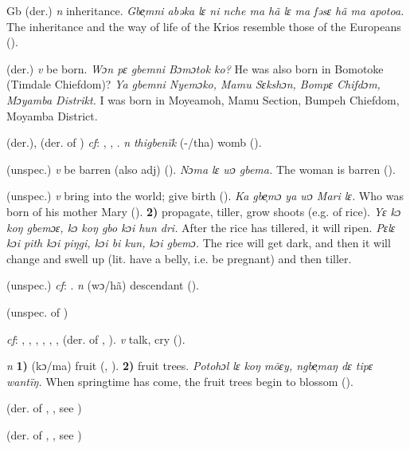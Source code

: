 \begin{letter}{Gb}
 (der.) \textit{n} inheritance. \textit{Gbe̹mni abəka lɛ ni nche ma hã lɛ ma fəsɛ hã ma apotoa.} The inheritance and the way of life of the Krios resemble those of the Europeans (\citealt{Pichl1967}). 

 (der.) \textit{v} be born. \textit{Wɔn pɛ gbemni Bɔmɔtok ko?} He was also born in Bomotoke (Timdale Chiefdom)? \textit{Ya gbemni Nyemɔko, Mamu Sɛkshɔn, Bompɛ Chifdɔm, Mɔyamba Distrikt.} I was born in Moyeamoh, Mamu Section, Bumpeh Chiefdom, Moyamba District.

 (der.), (der. of ) \textit{cf}: , , . \textit{n} \textit{thigbenïk} (-/tha) womb (\citealt{Pichl1967}). 

 (unspec.) \textit{v} be barren (also adj) (\citealt{Pichl1967}). \textit{Nɔma lɛ wɔ gbema.} The woman is barren (\citealt{Pichl1967}). 

 (unspec.) \textit{v} bring into the world; give birth (\citealt{Pichl1967}). \textit{Ka gbe̹mɔ ya wɔ Mari lɛ.} Who was born of his mother Mary (\citealt{Pichl1967}). \textbf{2)} propagate, tiller, grow shoots (e.g. of rice). \textit{Yɛ kɔ koŋ gbemɔɛ, kɔ koŋ gbo kɔi hun dri.} After the rice has tillered, it will ripen. \textit{Pɛlɛ kɔi pith kɔi piŋgi, kɔi bi kun, kɔi gbemɔ.} The rice will get dark, and then it will change and swell up (lit. have a belly, i.e. be pregnant) and then tiller.

 (unspec.) \textit{cf}: . \textit{n} (wɔ/hã) descendant (\citealt{Pichl1967}).

 (unspec. of ) 

 \textit{cf}: , , , , , ,  (der. of , ). \textit{v} talk, cry (\citealt{Pichl1967}). 

 \textit{n} \textbf{1)} (kɔ/ma) fruit (\citealt{Pichl1967}, \citealt{Sumner1921}). \textbf{2)} fruit trees. \textit{Potohɔl lɛ koŋ mõɛy, ngbe̹maŋ dɛ tipɛ wantïŋ.} When springtime has come, the fruit trees begin to blossom (\citealt{Pichl1967}). 

 (der. of , , see ) 

 (der. of , , see )


\end{letter}
